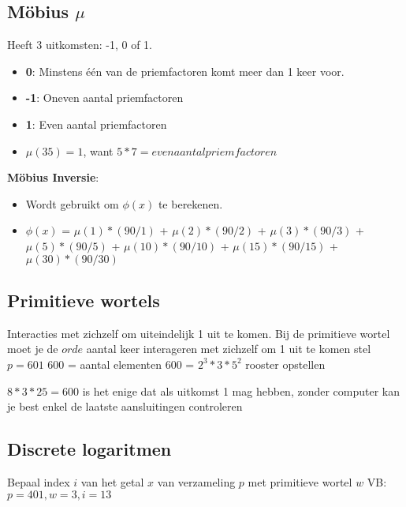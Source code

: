 \documentclass[12pt]{report}
\newcommand{\todo}[1] {
\color{red}\textunderscore{\textit{TODO: #1}}
\color{black}
}
\newcommand{\important}[1] {\textbf{\color{orange}#1}}
\begin{document}
\subsection{Möbius $\mu$}
Heeft 3 uitkomsten: -1, 0 of 1.
\begin{itemize}
 \item \important{0}: Minstens één van de priemfactoren komt meer dan 1 keer voor.
 \item \important{-1}: Oneven aantal priemfactoren
 \item \important{1}: Even aantal priemfactoren
 \item $\mu(35) = 1 $, want $ 5 * 7 = even aantal priemfactoren$
\end{itemize}
 
\important{Möbius Inversie}:
\begin{itemize}
 \item Wordt gebruikt om $\phi(x)$ te berekenen.
 \item $\phi(x)$ = $\mu(1) * (90/1)$ 
  \newline +  $\mu(2) * (90/2)$
  \newline +  $\mu(3) * (90/3)$
  \newline +  $\mu(5) * (90/5)$
  \newline +  $\mu(10) * (90/10)$
  \newline +  $\mu(15) * (90/15)$
  \newline +  $\mu(30) * (90/30)$
\end{itemize}

\subsection{Primitieve wortels}
Interacties met zichzelf om uiteindelijk 1 uit te komen. 
Bij de primitieve wortel moet je de $orde$ aantal keer interageren
met zichzelf om 1 uit te komen
\newline
stel $p = 601$
600 = aantal elementen 
600 = $2^3 * 3 * 5^2$
\newline
rooster opstellen \todo{rooster}
$8 * 3 * 25 = 600$ is het enige dat als uitkomst 1 mag hebben,
zonder computer kan je best enkel de laatste aansluitingen controleren

\subsection{Discrete logaritmen}
Bepaal index $i$ van het getal $x$ van verzameling $p$ met primitieve wortel $w$
\newline
VB: $p = 401, w=3, i=13$
\end{document}
